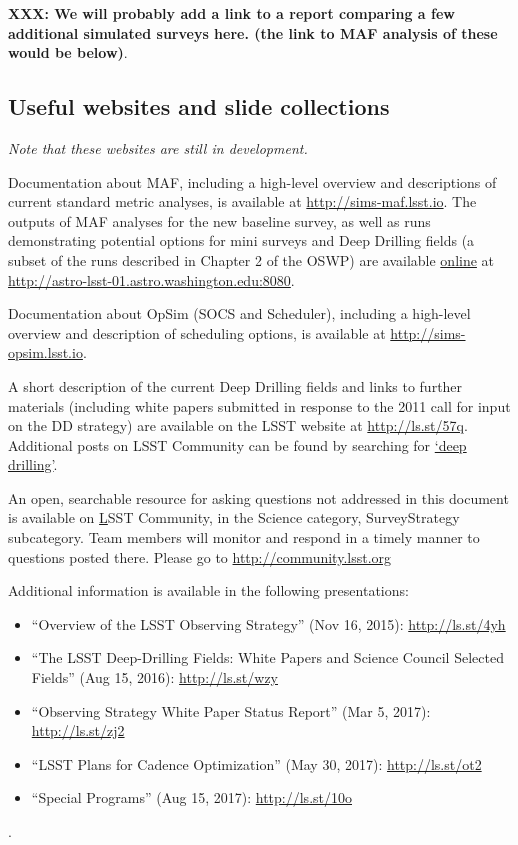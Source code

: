 \documentclass[DM,lsstdraft,toc,usenatbib]{lsstdoc}
\begin{document}
{\bf XXX: We will probably add a link to a report comparing a few additional simulated surveys here.  (the link to MAF analysis of these would be below)}.


\subsection{Useful websites and slide collections}

{\it Note that these websites are still in development.}

Documentation about MAF, including a high-level overview and descriptions of current standard metric analyses, is available at \url{http://sims-maf.lsst.io}. 
The outputs of MAF analyses for the new baseline survey, as well as runs demonstrating potential options for mini surveys and Deep 
Drilling fields (a subset of the runs described in Chapter 2 of the OSWP) are available \href{http://astro-lsst-01.astro.washington.edu:8080}{online} at \url{http://astro-lsst-01.astro.washington.edu:8080}. 

Documentation about OpSim (SOCS and Scheduler), including a high-level overview and description of scheduling options, is available at \url{http://sims-opsim.lsst.io}.

A short description of the current Deep Drilling fields and links to further materials (including white papers submitted in response to the 2011 call for input on the DD strategy) are available on the LSST website at \href{https://www.lsst.org/scientists/survey-design/ddf}{http://ls.st/57q}. Additional posts on LSST Community can be found by searching for \href{https://community.lsst.org/search?q=deep%20drilling}{`deep drilling'}. 

An open, searchable resource for asking questions not addressed in this document is available on \href{http://community.lsst.org}LSST Community, in the Science category, SurveyStrategy subcategory. Team members will monitor and respond in a timely manner to questions posted there.  Please go to \url{http://community.lsst.org}

Additional information is available in the following presentations:
\begin{itemize}
\item ``Overview of the LSST Observing Strategy'' (Nov 16, 2015): \url{http://ls.st/4yh}
\item ``The LSST Deep-Drilling Fields: White Papers and Science Council Selected Fields'' (Aug 15, 2016): \url{http://ls.st/wzy}
\item ``Observing Strategy White Paper Status Report'' (Mar 5, 2017): \url{http://ls.st/zj2}
\item ``LSST Plans for Cadence Optimization'' (May 30, 2017): \url{http://ls.st/ot2}
\item ``Special Programs'' (Aug 15, 2017): \url{http://ls.st/10o}
\end{itemize}.
\end{document}
